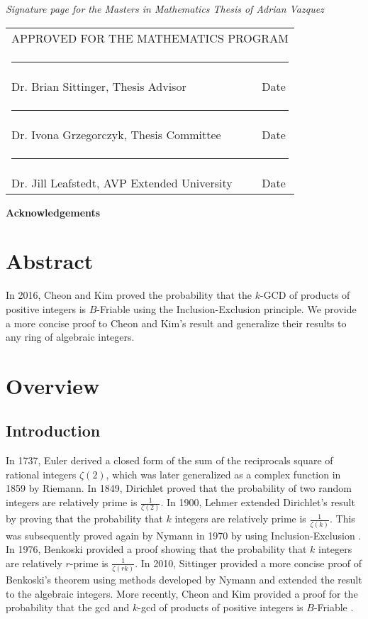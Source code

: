 \documentclass[12pt]{amsart}
\def\name{Adrian Vazquez}
\newcommand{\thesisadvisor}{Dr. Brian Sittinger}
\newcommand{\firstfaculty}{Dr. Ivona Grzegorczyk}
\newcommand{\univefaculty}{Dr. Jill Leafstedt}
\newcommand{\committee}{\vspace*{1.25in} 
\begin{tabular}{ll}
   \multicolumn{2}{c}{\hspace*{2.9cm} APPROVED FOR THE MATHEMATICS PROGRAM}\\[10mm]
   \multicolumn{2}{c}{\hspace*{1.65cm}\rule{4.5in}{.01in}}\\[-4mm]
   \hspace*{3cm}\thesisadvisor, Thesis Advisor \hspace*{0cm}&  Date\\[4mm]
   \multicolumn{2}{c}{\hspace*{1.65cm}\rule{4.5in}{.01in}}\\[-4mm]
   \hspace*{3cm}\firstfaculty, Thesis Committee \hspace*{0cm}&  Date\\[4mm]
   \multicolumn{2}{c}{\hspace*{1.65cm}\rule{4.5in}{.01in}}\\[-4mm]
    \hspace*{3cm}\univefaculty, AVP Extended University \hspace*{0cm}&  Date\\
 \end{tabular}}
\theoremstyle{definition}
\begin{document}
\newpage
 \setlength{\paperheight}{13in}
 \setlength{\topmargin}{1.25cm}

{\center\emph{Signature page for the Masters in Mathematics Thesis of \name}}

\committee


 \newpage
 \setlength{\topmargin}{-0.4375in}
 \setlength{\paperheight}{11.5in}

\newpage

\begin{center}
\vspace*{50mm}
{\bf Acknowledgements}
\end{center}

\newpage

\pagestyle{plain}

\section*{Abstract}
In 2016, Cheon and Kim proved the probability that the $k$-GCD of products of positive integers is $B$-Friable using the Inclusion-Exclusion principle. We provide a more concise proof to Cheon and Kim's result and generalize their results to any ring of algebraic integers.

\newpage
\tableofcontents
\newpage
\newpage
{}

\section{Overview}

\subsection{Introduction}

In 1737, Euler derived a closed form of the sum of the reciprocals square of rational integers $\zeta(2)$, which was later generalized as a complex function in 1859 by Riemann. In 1849, Dirichlet \cite{Dirichlet} proved that the probability of two random integers are relatively prime is $\frac{1}{\zeta(2)}$. In 1900, Lehmer \cite{Lehmer} extended Dirichlet's result by proving that the probability that $k$ integers are relatively prime is $\frac{1}{\zeta(k)}$. This was subsequently proved again by Nymann in 1970 by using Inclusion-Exclusion \cite{Nymann}. In 1976, Benkoski \cite{Benkoski} provided a proof showing that the probability that $k$ integers are relatively $r$-prime is $\frac{1}{\zeta(rk)}$. In 2010, Sittinger \cite{Sittinger} provided a more concise proof of Benkoski's theorem using methods developed by Nymann and extended the result to the algebraic integers. More recently, Cheon and Kim provided a proof for the probability that the gcd and $k$-gcd of products of positive integers is $B$-Friable \cite{Cheon}.
\end{document}
